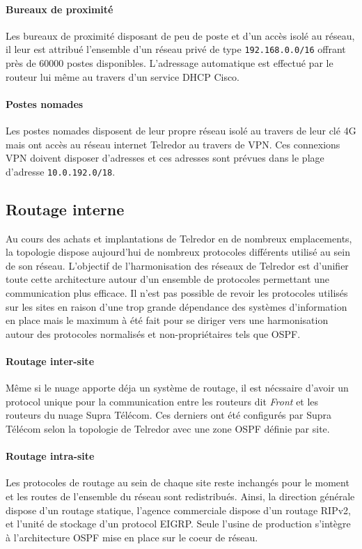 \documentclass{article}
\newcommand{\tlr}{Telredor\xspace}
\newcommand{\spr}{Supra Télécom\xspace}
\begin{document}
\paragraph{Bureaux de proximité} Les bureaux de proximité disposant de peu de poste et d'un accès isolé au réseau, il leur est attribué l'ensemble d'un réseau privé de type \texttt{192.168.0.0/16} offrant près de 60000 postes disponibles.
L'adressage automatique est effectué par le routeur lui même au travers d'un service DHCP Cisco.

\paragraph{Postes nomades} Les postes nomades disposent de leur propre réseau isolé au travers de leur clé 4G mais ont accès au réseau internet \tlr au travers de VPN.
Ces connexions VPN doivent disposer d'adresses et ces adresses sont prévues dans le plage d'adresse \texttt{10.0.192.0/18}.

\subsection{Routage interne}

Au cours des achats et implantations de \tlr en de nombreux emplacements, la topologie dispose aujourd'hui de nombreux protocoles différents utilisé au sein de son réseau.
L'objectif de l'harmonisation des réseaux de \tlr est d'unifier toute cette architecture autour d'un ensemble de protocoles permettant une communication plus efficace.
Il n'est pas possible de revoir les protocoles utilisés sur les sites en raison d'une trop grande dépendance des systèmes d'information en place mais le maximum à été fait pour se diriger vers une harmonisation autour des protocoles normalisés et non-propriétaires tels que OSPF.

\paragraph{Routage inter-site} Même si le nuage apporte déja un système de routage, il est nécssaire d'avoir un protocol unique pour la communication entre les routeurs dit \emph{Front} et les routeurs du nuage \spr.
Ces derniers ont été configurés par \spr selon la topologie de \tlr avec une zone OSPF définie par site.

\paragraph{Routage intra-site} Les protocoles de routage au sein de chaque site reste inchangés pour le moment et les routes de l'ensemble du réseau sont redistribués.
Ainsi, la direction générale dispose d'un routage statique, l'agence commerciale dispose d'un routage RIPv2, et l'unité de stockage d'un protocol EIGRP.
Seule l'usine de production s'intègre à l'architecture OSPF mise en place sur le coeur de réseau.
\end{document}
